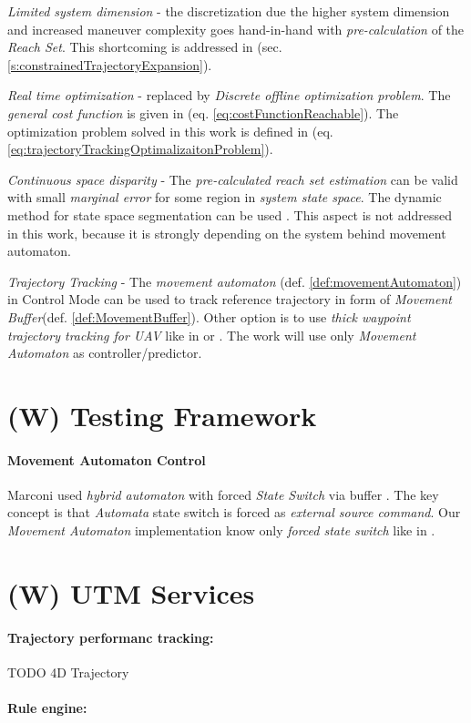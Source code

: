 \emph{Limited system dimension} - the discretization due the higher system dimension and  increased maneuver complexity goes hand-in-hand with \emph{pre-calculation} of the \emph{Reach Set}. This shortcoming is addressed in (sec. \ref{s:constrainedTrajectoryExpansion}).

\emph{Real time optimization} -  replaced by \emph{Discrete offline optimization problem}. The \emph{general cost function} is given in (eq. \ref{eq:costFunctionReachable}). The optimization problem solved in this work is defined in (eq. \ref{eq:trajectoryTrackingOptimalizaitonProblem}).

\emph{Continuous space disparity} - The \emph{pre-calculated reach set estimation} can be valid with small \emph{marginal error} for some region in \emph{system state space}. The dynamic method for state space segmentation can be used \cite{takahashi1996reasonable}. This aspect is not addressed in this work, because it is strongly depending on the system behind movement automaton. 

\emph{Trajectory Tracking} - The \emph{movement automaton} (def. \ref{def:movementAutomaton}) in Control Mode can be used to track reference trajectory in form of \emph{Movement Buffer}(def. \ref{def:MovementBuffer}). Other option is to use \emph{thick waypoint trajectory tracking for UAV} like in \cite{kaminer1998trajectory} or \cite{murillo2015generalized}. The work will use only \emph{Movement Automaton} as controller/predictor. 




\section{(W) Testing Framework}\label{s:TestingFrameworkTheory}

\paragraph{Movement Automaton Control} Marconi used \emph{hybrid automaton} with forced \emph{State Switch} via buffer \cite{marconi2009control}. The key concept is that \emph{Automata} state switch is forced as \emph{external source command}. Our \emph{Movement Automaton} implementation know only \emph{forced state switch} like in \cite{frazzoli2000trajectory}. 

\section{(W) UTM Services}\label{s:utmServicesTheory}
\paragraph{Trajectory performanc tracking:} TODO 4D Trajectory \cite{gardi20154} 
\paragraph{Rule engine:}





	